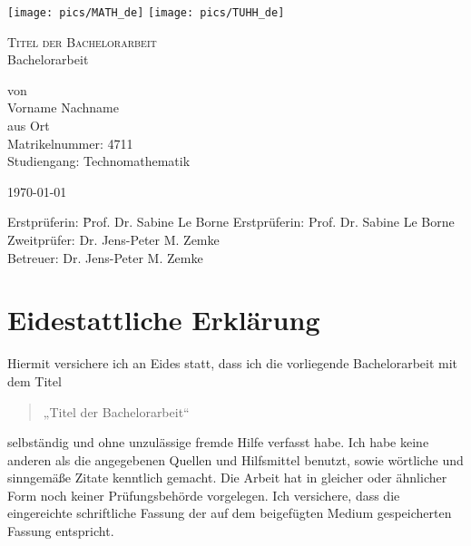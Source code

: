 \documentclass[12pt]{article}
\theoremstyle{definition}
\numberwithin{equation}{section}
\begin{document}
\thispagestyle{empty}

\begin{center}
  \texttt{[image: pics/MATH\_de]}
  \hfill
  \texttt{[image: pics/TUHH\_de]}
\end{center}

\vspace*{5em}

\begin{center}
  {\Huge
    \textsc{Titel der Bachelorarbeit}\\[2em]
  }
  {\LARGE
    Bachelorarbeit
  }

  \vspace*{2em}

  {\Large
    von\\
    Vorname Nachname\\
    aus Ort\\
    Matrikelnummer: 4711\\
    Studiengang: Technomathematik\\
  }
\end{center}

\vfill
\begin{center}
  \today
\end{center}
\vfill

\begin{tabbing}
  Erstprüferin: \= Prof. Dr. Sabine Le Borne\kill
  Erstprüferin: \> Prof. Dr. Sabine Le Borne\\
  Zweitprüfer:  \> Dr. Jens-Peter M. Zemke\\
  Betreuer:     \> Dr. Jens-Peter M. Zemke\\
\end{tabbing}
\newpage
\thispagestyle{empty}
\mbox{}
\newpage

\section*{Eidestattliche Erklärung}

Hiermit versichere ich an Eides statt, dass ich die vorliegende
Bachelorarbeit mit dem Titel
\begin{quote}
  „Titel der Bachelorarbeit“  
\end{quote}
selbständig und ohne unzulässige fremde Hilfe verfasst habe. Ich habe
keine anderen als die angegebenen Quellen und Hilfsmittel benutzt,
sowie wörtliche und sinngemäße Zitate kenntlich gemacht. Die Arbeit
hat in gleicher oder ähnlicher Form noch keiner Prüfungsbehörde
vorgelegen. Ich versichere, dass die eingereichte schriftliche Fassung
der auf dem beigefügten Medium gespeicherten Fassung entspricht.
\end{document}
